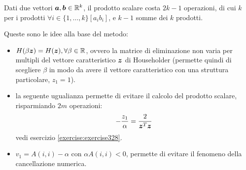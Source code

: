 \begin{oss}
Dati due vettori $\boldsymbol{a}, \boldsymbol{b} \in \mathbb{R}^{k}$, il prodotto scalare
costa $2k - 1$ operazioni, di cui $k$ per i prodotti $\forall i \in
\{1, \ldots , k \} [a_{i}b_{i}]$, e $k-1$ somme dei $k$ prodotti.
\end{oss}

\begin{oss}
Queste sono le idee alla base del metodo:
\begin{itemize}
  \item $H(\beta \boldsymbol{z}) = H(\boldsymbol{z}), \forall \beta \in \mathbb{R}$, ovvero
  la matrice di eliminazione non varia per multipli del vettore caratteristico
  $\boldsymbol{z}$ di Householder (permette quindi di scegliere $\beta$ in modo
  da avere il vettore caratteristico con una struttura particolare, $z_{1} =
  1$).
  
  \item la seguente ugualianza permette di evitare il calcolo del prodotto
  scalare, risparmiando $2m$ operazioni:
  	\begin{displaymath}
  		-\frac{z_{1}}{\alpha} =
  		\frac{2}{\boldsymbol{z}^{T}\boldsymbol{z}}
  	\end{displaymath}
  vedi esercizio \ref{exercise:exercise328}.
  
  \item $v_{1} = A(i, i) - \alpha$ con $\alpha A(i, i) < 0$, permette di
  evitare il fenomeno della cancellazione numerica.
\end{itemize}
\end{oss}

